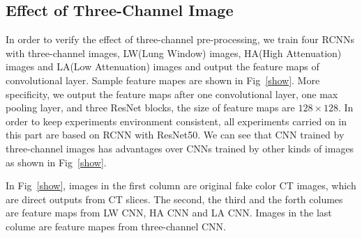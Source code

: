 \documentclass[journal]{IEEEtran}
\begin{document}
\subsection{Effect of Three-Channel Image}
\label{effectiveness}
In order to verify the effect of three-channel pre-processing, we train four RCNNs with three-channel images, LW(Lung Window) images, HA(High Attenuation) images and LA(Low Attenuation) images and output the feature maps of convolutional layer. Sample feature mapes are shown in Fig~\ref{show}. More specificity, we output the feature maps after one convolutional layer, one max pooling layer, and three ResNet blocks, the size of feature maps are $128 \times 128$. In order to keep experiments environment consistent, all experiments carried on in this part are based on RCNN with ResNet50. We can see that CNN trained by three-channel images has advantages over CNNs trained by other kinds of images as shown in Fig~\ref{show}. 

In Fig~\ref{show}, images in the first column are original fake color CT images, which are direct outputs from CT slices. The second, the third and the forth columes are feature maps from LW CNN, HA CNN and LA CNN. Images in the last colume are feature mapes from three-channel CNN.
\end{document}
